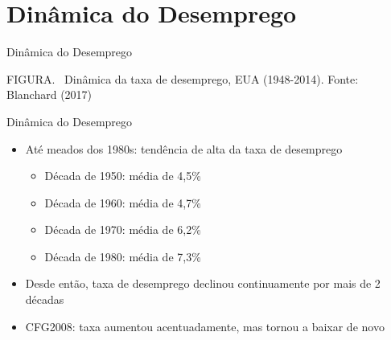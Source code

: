 \documentclass[10pt]{beamer}
\begin{document}
\section{Dinâmica do Desemprego}
\begin{frame}{Dinâmica do Desemprego}
    \begin{center}
		\begin{minipage}[b]{\textwidth}
			\tiny{{\scshape FIGURA}. \ Dinâmica da taxa de desemprego, EUA (1948-2014). Fonte: Blanchard (2017)} 
		\end{minipage}
	\end{center}
\end{frame}

\begin{frame}{Dinâmica do Desemprego}
    \begin{itemize}
        \item Até meados dos 1980s: tendência de alta da taxa de desemprego\medskip
        \begin{itemize}
            \item Década de 1950: média de 4,5\%\medskip
            \item Década de 1960: média de 4,7\%\medskip
            \item Década de 1970: média de 6,2\%\medskip
            \item Década de 1980: média de 7,3\%\medskip
        \end{itemize}
        \item Desde então, taxa de desemprego declinou continuamente por mais de 2 décadas\bigskip
        \item CFG2008: taxa aumentou acentuadamente, mas tornou a baixar de novo
    \end{itemize}
\end{frame}
\end{document}
